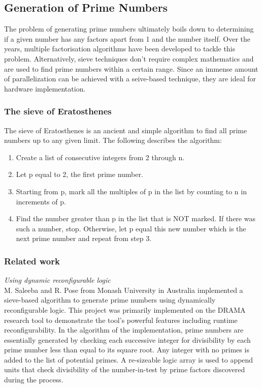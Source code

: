 \documentclass[journal]{IEEEtran}
\begin{document}
\subsection{Generation of Prime Numbers}
The problem of generating prime numbers ultimately boils down to determining if a given number has any factors apart from 1 and the number itself. Over the years, multiple factorisation algorithms have been developed to tackle this problem. Alternatively, sieve techniques don't require complex mathematics and are used to find prime numbers within a certain range. Since an immense amount of parallelization can be achieved with a seive-based technique, they are ideal for hardware implementation.

\subsubsection{The sieve of Eratosthenes}
The sieve of Eratosthenes is an ancient and simple algorithm to find all prime numbers up to any given limit. The following describes the algorithm: \\

\begin{enumerate}

	\item Create a list of consecutive integers from 2 through n.
	\item Let p equal to 2, the first prime number.
	\item Starting from p, mark all the multiples of p in the list by counting to n in increments of p.
	\item Find the number greater than p in the list that is NOT marked. If there was such a number, stop. Otherwise, let p equal this new number which is the next prime number and repeat from step 3. 

\end{enumerate}

\subsubsection{Related work}

\textit{Using dynamic reconfigurable logic}\\
M. Saleeba and R. Pose from Monash University in Australia implemented a sieve-based algorithm to generate prime numbers using dynamically reconfigurable logic\cite{ausPrime}. This project was primarily implemented on the DRAMA research tool to demonstrate the tool's powerful features including runtime reconfigurability. In the algorithm of the implementation, prime numbers are essentially generated by checking each successive integer for divisibility by each prime number less than equal to its square root. Any integer with no primes is added to the list of potential primes. A re-sizeable logic array is used to append units that check divisibility of the number-in-test by prime factors discovered during the process.\\
\end{document}

